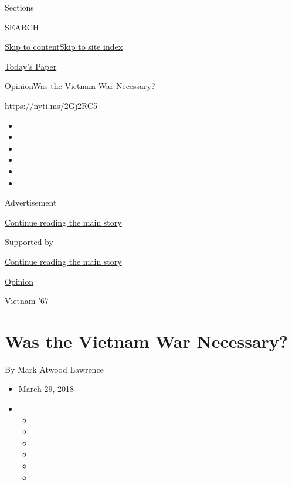 Sections

SEARCH

\protect\hyperlink{site-content}{Skip to
content}\protect\hyperlink{site-index}{Skip to site index}

\href{https://myaccount.nytimes.com/auth/login?response_type=cookie\&client_id=vi}{}

\href{https://www.nytimes.com/section/todayspaper}{Today's Paper}

\href{/section/opinion}{Opinion}\textbar{}Was the Vietnam War Necessary?

\href{https://nyti.ms/2Gj2RC5}{https://nyti.ms/2Gj2RC5}

\begin{itemize}
\item
\item
\item
\item
\item
\item
\end{itemize}

Advertisement

\protect\hyperlink{after-top}{Continue reading the main story}

Supported by

\protect\hyperlink{after-sponsor}{Continue reading the main story}

\href{/section/opinion}{Opinion}

\href{/column/vietnam-67}{Vietnam '67}

\hypertarget{was-the-vietnam-war-necessary}{%
\section{Was the Vietnam War
Necessary?}\label{was-the-vietnam-war-necessary}}

By Mark Atwood Lawrence

\begin{itemize}
\item
  March 29, 2018
\item
  \begin{itemize}
  \item
  \item
  \item
  \item
  \item
  \item
  \end{itemize}
\end{itemize}

